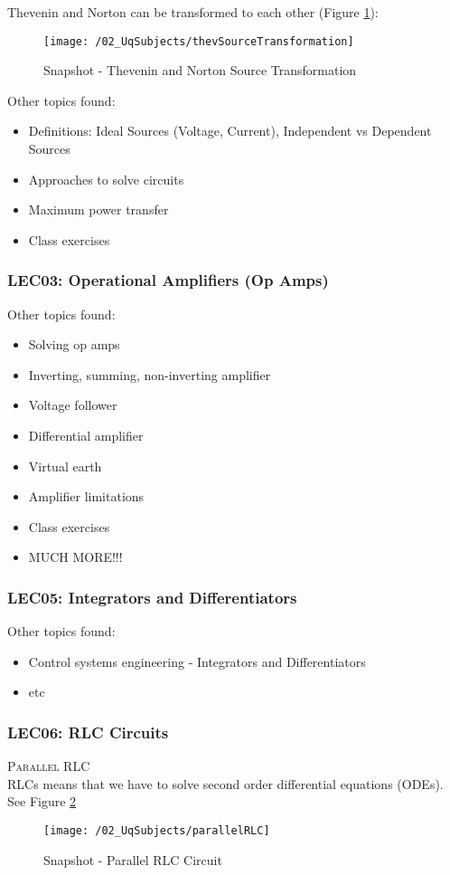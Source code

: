 Thevenin and Norton can be transformed to each other (Figure \ref{fig_theveninSourceTrans}):
\begin{figure}
  \texttt{[image: /02\_UqSubjects/thevSourceTransformation]}
  \caption{Snapshot - Thevenin and Norton Source Transformation}
  \label{fig_theveninSourceTrans}
\end{figure}

Other topics found:
\begin{itemize}
  \item Definitions: Ideal Sources (Voltage, Current), Independent vs Dependent Sources
  \item Approaches to solve circuits
  \item Maximum power transfer
  \item Class exercises
\end{itemize}
\clearpage

\subsubsection{LEC03: Operational Amplifiers (Op Amps)}
Other topics found:
\begin{itemize}
  \item Solving op amps
  \item Inverting, summing, non-inverting amplifier
  \item Voltage follower
  \item Differential amplifier
  \item Virtual earth
  \item Amplifier limitations
  \item Class exercises
  \item MUCH MORE!!!
\end{itemize}

\subsubsection{LEC05: Integrators and Differentiators}
Other topics found:
\begin{itemize}
  \item Control systems engineering - Integrators and Differentiators
  \item etc
\end{itemize}
\clearpage

\subsubsection{LEC06: RLC Circuits}
\textsc{\large Parallel RLC}\\
RLCs means that we have to solve second order differential equations (ODEs). See Figure \ref{fig_parallelRLC}
\begin{figure}
  \texttt{[image: /02\_UqSubjects/parallelRLC]}
  \caption{Snapshot - Parallel RLC Circuit}
  \label{fig_parallelRLC}
\end{figure}

